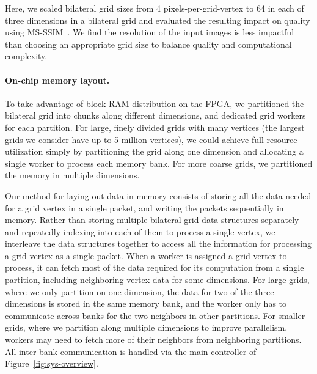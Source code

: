 Here, we scaled bilateral grid sizes from 4 pixels-per-grid-vertex to 64 in each of three dimensions in a bilateral grid and evaluated the resulting impact on quality using MS-SSIM~\cite{msssim}. We find the resolution of the input images is less impactful than choosing an appropriate grid size to balance quality and computational complexity.

\paragraph{On-chip memory layout.}
To take advantage of block RAM distribution on the FPGA, we partitioned the bilateral grid into chunks along different dimensions, and dedicated grid workers for each partition. 
For large, finely divided grids with many vertices (the largest grids we consider have up to 5 million vertices), we could achieve full resource utilization simply by partitioning the grid along one dimension and allocating a single worker to process each memory bank. 
For more coarse grids, we partitioned the memory in multiple dimensions. 

Our method for laying out data in memory consists of storing all the data needed for a grid vertex in a single packet, and writing the packets sequentially in memory.
Rather than storing multiple bilateral grid data structures separately and repeatedly indexing into each of them to process a single vertex, we interleave the data structures together to access all the information for processing a grid vertex as a single packet. 
When a worker is assigned a grid vertex to process, it can fetch most of the data required for its computation from a single partition, including neighboring vertex data for some dimensions. 
For large grids, where we only partition on one dimension, the data for two of the three dimensions is stored in the same memory bank, and the worker only has to communicate across banks for the two neighbors in other partitions.
For smaller grids, where we partition along multiple dimensions to improve parallelism, workers may need to fetch more of their neighbors from neighboring partitions.
All inter-bank communication is handled via the main controller of Figure~\ref{fig:sys-overview}. 

